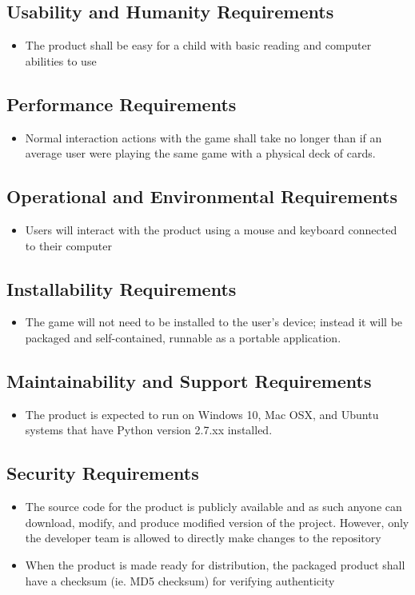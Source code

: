 \documentclass{article}
\newcommand {\PYVER}{2.7.xx }
\begin{document}
		\subsection{Usability and Humanity Requirements}
		\begin{itemize}
			\itemsep0em
			\item The product shall be easy for a child with basic reading and 
			computer abilities to use
		\end{itemize}
		\subsection{Performance Requirements}
		\begin{itemize}
			\itemsep0em
			\item Normal interaction actions with the game shall take no longer 
			than if an average user were playing the same game with a physical 
			deck of cards.
		\end{itemize}
		\subsection{Operational and Environmental Requirements}
		\begin{itemize}
			\itemsep0em
			\item Users will interact with the product using a mouse and 
			keyboard connected to their computer
		\end{itemize}
		\subsection{Installability Requirements}
		\begin{itemize}
			\itemsep0em
			\item The game will not need to be installed to the user's device; instead
			it will be packaged and self-contained, runnable as a portable application.
		\end{itemize}
		\subsection{Maintainability and Support Requirements}
		\begin{itemize}
			\itemsep0em
			\item The product is expected to run on Windows 10, Mac OSX, and 
			Ubuntu systems that have Python version \PYVER installed.
		\end{itemize}
		\subsection{Security Requirements}
		\begin{itemize}
			\itemsep0em
			\item The source code for the product is publicly available and as such
			anyone can download, modify, and produce modified version of the project.
			However, only the developer team is allowed to directly make changes to the 
			repository
			\item When the product is made ready for distribution, the packaged product
			shall have a checksum (ie. MD5 checksum) for verifying authenticity
		\end{itemize}
\end{document}
